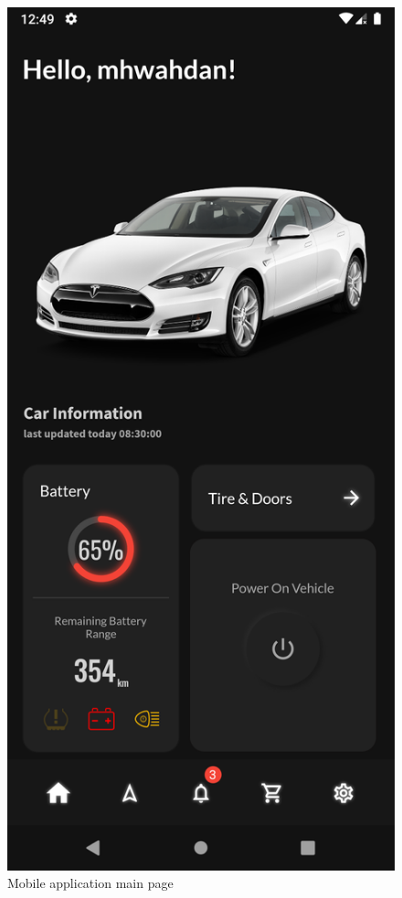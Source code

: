 \documentclass[
12pt,
oneside, 
onehalfspacing, 
nolistspacing, 
parskip, 
chapterinoneline, 
]{AASTCOMPUTER}
\begin{document}
\begin{figure}[!ht]
	\centering
	\includegraphics[scale=0.15]{Figures/mobileApp/6.png}
  	\caption{Mobile application main page}
  	\label{fig:Mobile application main page}
\end{figure}
\end{document}
